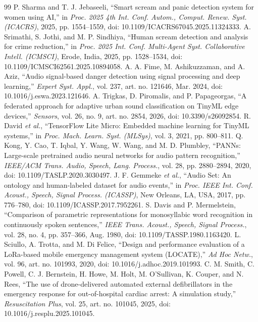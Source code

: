 \documentclass[conference]{IEEEtran}
\begin{document}
\begin{thebibliography}{99}
 P. Sharma and T. J. Jebaseeli, ``Smart scream and panic detection system for women using AI,'' in \emph{Proc. 2025 4th Int. Conf. Autom., Comput. Renew. Syst. (ICACRS)}, 2025, pp. 1554--1559, doi: 10.1109/ICACRS67045.2025.11324333.
 A. Srimathi, S. Jothi, and M. P. Sindhiya, ``Human scream detection and analysis for crime reduction,'' in \emph{Proc. 2025 Int. Conf. Multi-Agent Syst. Collaborative Intell. (ICMSCI)}, Erode, India, 2025, pp. 1528--1534, doi: 10.1109/ICMSCI62561.2025.10894058.
 A. A. Fime, M. Ashikuzzaman, and A. Aziz, ``Audio signal-based danger detection using signal processing and deep learning,'' \emph{Expert Syst. Appl.}, vol. 237, art. no. 121646, Mar. 2024, doi: 10.1016/j.eswa.2023.121646.
 A. Trigkas, D. Piromalis, and P. Papageorgas, ``A federated approach for adaptive urban sound classification on TinyML edge devices,'' \emph{Sensors}, vol. 26, no. 9, art. no. 2854, 2026, doi: 10.3390/s26092854.
 R. David \emph{et al.}, ``TensorFlow Lite Micro: Embedded machine learning for TinyML systems,'' in \emph{Proc. Mach. Learn. Syst. (MLSys)}, vol. 3, 2021, pp. 800--811.
 Q. Kong, Y. Cao, T. Iqbal, Y. Wang, W. Wang, and M. D. Plumbley, ``PANNs: Large-scale pretrained audio neural networks for audio pattern recognition,'' \emph{IEEE/ACM Trans. Audio, Speech, Lang. Process.}, vol. 28, pp. 2880--2894, 2020, doi: 10.1109/TASLP.2020.3030497.
 J. F. Gemmeke \emph{et al.}, ``Audio Set: An ontology and human-labeled dataset for audio events,'' in \emph{Proc. IEEE Int. Conf. Acoust., Speech, Signal Process. (ICASSP)}, New Orleans, LA, USA, 2017, pp. 776--780, doi: 10.1109/ICASSP.2017.7952261.
 S. Davis and P. Mermelstein, ``Comparison of parametric representations for monosyllabic word recognition in continuously spoken sentences,'' \emph{IEEE Trans. Acoust., Speech, Signal Process.}, vol. 28, no. 4, pp. 357--366, Aug. 1980, doi: 10.1109/TASSP.1980.1163420.
 L. Sciullo, A. Trotta, and M. Di Felice, ``Design and performance evaluation of a LoRa-based mobile emergency management system (LOCATE),'' \emph{Ad Hoc Netw.}, vol. 96, art. no. 101993, 2020, doi: 10.1016/j.adhoc.2019.101993.
 C. M. Smith, C. Powell, C. J. Bernstein, H. Howe, M. Holt, M. O'Sullivan, K. Couper, and N. Rees, ``The use of drone-delivered automated external defibrillators in the emergency response for out-of-hospital cardiac arrest: A simulation study,'' \emph{Resuscitation Plus}, vol. 25, art. no. 101045, 2025, doi: 10.1016/j.resplu.2025.101045.

\end{thebibliography}
\end{document}
